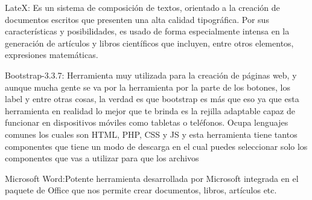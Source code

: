 LateX: Es un sistema de composición de textos, orientado a la creación de documentos escritos que presenten una alta calidad tipográfica. Por sus características y posibilidades, es usado de forma especialmente intensa en la generación de artículos y libros científicos que incluyen, entre otros elementos, expresiones matemáticas.

Bootstrap-3.3.7: Herramienta muy utilizada para la creación de páginas web, y aunque mucha gente se va por la herramienta por la parte de los botones, los label y entre otras cosas, la verdad es que bootstrap es más que eso ya que esta herramienta en realidad lo mejor que te brinda es la rejilla adaptable capaz de funcionar en dispositivos móviles como tabletas o teléfonos. Ocupa lenguajes comunes los cuales son HTML, PHP, CSS y JS y esta herramienta tiene tantos componentes que tiene un modo de descarga en el cual puedes seleccionar solo los componentes que vas a utilizar para que los archivos

Microsoft Word:Potente herramienta desarrollada por Microsoft integrada en el paquete de Office que nos permite crear documentos, libros, artículos etc.
